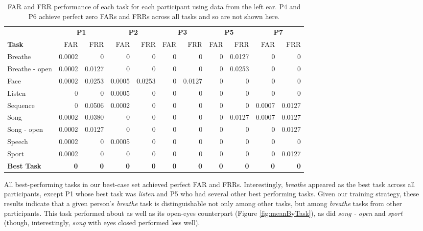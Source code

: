 \documentclass{sigchi}
\begin{document}
\begin{table}[h]
\centering
\begin{tabularx}{.85\textwidth}{lrrrrrrrrrr}
& \multicolumn{2}{c}{\textbf{P1}} & \multicolumn{2}{c}{\textbf{P2}} & \multicolumn{2}{c}{\textbf{P3}} & \multicolumn{2}{c}{\textbf{P5}} & \multicolumn{2}{c}{\textbf{P7}}\\
\textbf{Task} & FAR & FRR & FAR & FRR & FAR & FRR & FAR & FRR & FAR & FRR\\ \hline
Breathe & 0.0002 & 0 & 0 & 0 & 0 & 0 & 0 & 0.0127 & 0 & 0\\
Breathe - open & 0.0002 & 0.0127 & 0 & 0 & 0 & 0 & 0 & 0.0253 & 0 & 0\\
Face & 0.0002 & 0.0253 & 0.0005 & 0.0253 & 0 & 0.0127 & 0 & 0 & 0 & 0\\
Listen & 0 & 0 & 0.0005 & 0 & 0 & 0 & 0 & 0 & 0 & 0\\
Sequence & 0 & 0.0506 & 0.0002 & 0 & 0 & 0 & 0 & 0 & 0.0007 & 0.0127\\
Song	 & 0.0002 & 0.0380 & 0 & 0 & 0	 & 0 & 0 & 0.0127 & 0.0007 & 0.0127\\
Song - open & 0.0002 & 0.0127 & 0 & 0 & 0 & 0 & 0 & 0 & 0 & 0.0127\\
Speech & 0.0002 & 0 & 0.0005 & 0 & 0 & 0 & 0 & 0 & 0 & 0\\
Sport & 0.0002 & 0 & 0 & 0 & 0 & 0 & 0 & 0  & 0 & 0.0127\\
\textbf{Best Task} & \textbf{0} & \textbf{0} & \textbf{0} & \textbf{0} & \textbf{0} & \textbf{0} & \textbf{0} & \textbf{0} & \textbf{0} & \textbf{0}\\ \hline
\end{tabularx}
\caption{FAR and FRR performance of each task for each participant using data from the left ear. P4 and P6 achieve perfect zero FARs and FRRs across all tasks and so are not shown here.}
\label{tab:farfrrall}
\end{table}

All best-performing tasks in our best-case set achieved perfect FAR and FRRs. Interestingly, \textit{breathe} appeared as the best task across all participants, except P1 whose best task was \textit{listen} and P5 who had several other best performing tasks. Given our training strategy, these results indicate that a given person's \textit{breathe} task is distinguishable not only among other tasks, but among \textit{breathe} tasks from other participants.
This task performed about as well as its open-eyes counterpart (Figure \ref{fig:meanByTask}), as did \textit{song - open} and \textit{sport} (though, interestingly, \textit{song} with eyes closed performed less well).
\end{document}
